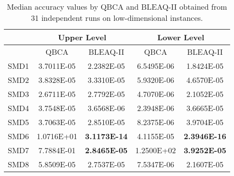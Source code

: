 \documentclass[conference]{IEEEtran}
\theoremstyle{definition}
\begin{document}
\begin{table}[t]
    \caption{Median accuracy values by QBCA and BLEAQ-II obtained from 31 independent runs on low-dimensional instances.}
    \label{tab:ll-comparative-vals-5}
    \centering
    \begin{tabular}{|c|c|c|c|c|}
\hline
& \multicolumn{2}{c|}{Upper Level} & \multicolumn{2}{c|}{Lower Level} \\ \hline
& QBCA & BLEAQ-II & QBCA & BLEAQ-II \\ \hline
SMD1 & 3.7011E-05 & 2.2382E-05 & 6.5495E-06 & 1.8424E-05\\ \hline 
SMD2 & 3.8328E-05 & 3.3310E-05 & 5.9320E-06 & 4.6570E-05\\ \hline 
SMD3 & 2.6711E-05 & 2.7792E-05 & 4.7070E-06 & 2.1052E-05\\ \hline 
SMD4 & 3.7548E-05 & 3.6568E-06 & 2.3948E-06 & 3.6665E-05\\ \hline 
SMD5 & 3.7063E-05 & 2.8510E-05 & 8.2375E-06 & 3.9704E-05\\ \hline 
SMD6 & 1.0716E+01 & \textbf{3.1173E-14} & 4.1155E-05 & \textbf{2.3946E-16}\\ \hline 
SMD7 & 7.7884E-01 & \textbf{2.8465E-05} & 1.2500E+02 & \textbf{3.9252E-05}\\ \hline 
SMD8 & 5.8509E-05 & 2.7537E-05 & 7.5347E-06 & 2.1607E-05\\ \hline 
    \end{tabular}
\end{table}
\end{document}
